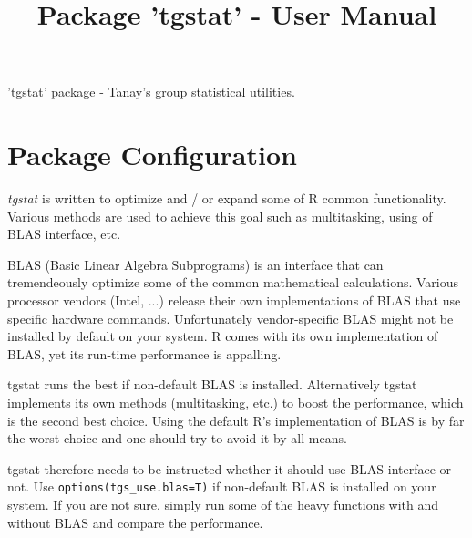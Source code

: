 \documentclass{article}
\begin{document}


\title{Package 'tgstat' - User Manual}
\maketitle

'tgstat' package - Tanay's group statistical utilities.

\tableofcontents

\newpage

\section{Package Configuration}

\emph{tgstat} is written to optimize and / or expand some of R common functionality. Various methods are used to achieve this goal such as multitasking, using of BLAS interface, etc.

BLAS (Basic Linear Algebra Subprograms) is an interface that can tremendeously optimize some of the common mathematical calculations. Various processor vendors (Intel, ...) release their own implementations of BLAS that use specific hardware commands. Unfortunately vendor-specific BLAS might not be installed by default on your system. R comes with its own implementation of BLAS, yet its run-time performance is appalling.

tgstat runs the best if non-default BLAS is installed. Alternatively tgstat implements its own methods (multitasking, etc.) to boost the performance, which is the second best choice. Using the default R's implementation of BLAS is by far the worst choice and one should try to avoid it by all means.

tgstat therefore needs to be instructed whether it should use BLAS interface or not. Use \texttt{options(tgs\_use.blas=T)} if non-default BLAS is installed on your system. If you are not sure, simply run some of the heavy functions with and without BLAS and compare the performance.
\end{document}
